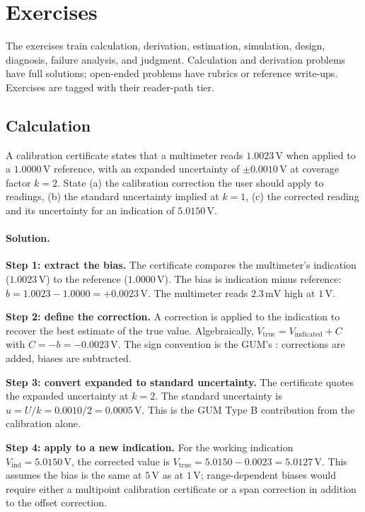 \section{Exercises}

The exercises train calculation, derivation, estimation, simulation,
design, diagnosis, failure analysis, and judgment. Calculation and
derivation problems have full solutions; open-ended problems have
rubrics or reference write-ups. Exercises are tagged with their
reader-path tier.

\subsection*{Calculation}

\begin{exercise}
A calibration certificate states that a multimeter reads
$1.0023 \,\si{\volt}$ when applied to a $1.0000 \,\si{\volt}$
reference, with an expanded uncertainty of $\pm 0.0010 \,\si{\volt}$
at coverage factor $k = 2$. State (a) the calibration correction the
user should apply to readings, (b) the standard uncertainty implied
at $k = 1$, (c) the corrected reading and its uncertainty for an
indication of $5.0150 \,\si{\volt}$.

\paragraph{Solution.}
\textbf{Step 1: extract the bias.} The certificate compares the
multimeter's indication ($1.0023 \,\si{\volt}$) to the reference
($1.0000 \,\si{\volt}$). The bias is indication minus reference:
$b = 1.0023 - 1.0000 = +0.0023 \,\si{\volt}$. The multimeter reads
$2.3 \,\si{\milli\volt}$ high at $1 \,\si{\volt}$.

\textbf{Step 2: define the correction.} A correction is applied to
the indication to recover the best estimate of the true value.
Algebraically, $V_{\text{true}} = V_{\text{indicated}} + C$ with
$C = -b = -0.0023 \,\si{\volt}$. The sign convention is the GUM's
\cite{std:iso-iec-guide98}: corrections are added, biases are
subtracted.

\textbf{Step 3: convert expanded to standard uncertainty.} The
certificate quotes the expanded uncertainty at $k = 2$. The standard
uncertainty is $u = U/k = 0.0010/2 = 0.0005 \,\si{\volt}$. This is
the GUM Type B contribution from the calibration alone.

\textbf{Step 4: apply to a new indication.} For the working
indication $V_{\text{ind}} = 5.0150 \,\si{\volt}$, the corrected
value is $V_{\text{true}} = 5.0150 - 0.0023 = 5.0127 \,\si{\volt}$.
This assumes the bias is the same at $5 \,\si{\volt}$ as at
$1 \,\si{\volt}$; range-dependent biases would require either a
multipoint calibration certificate or a span correction in addition
to the offset correction.


\end{exercise}
